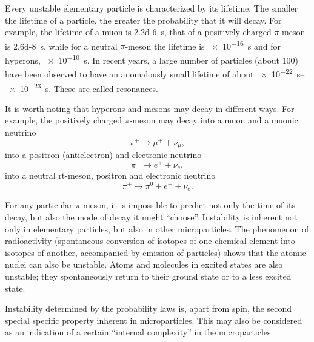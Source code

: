 \documentclass[a4paper,sfsidenotes,colorlinks=true]{tufte-book}
\numberwithin{equation}{section}
\numberwithin{figure}{section}
\begin{document}
Every unstable elementary particle is characterized by its
lifetime. The smaller the lifetime of a particle, the greater the
probability that it will decay. For example, the lifetime of a muon is
\SI{2.2d-6}{\second}, that of a positively charged $\pi$-meson is
\SI{2.6d-8}{\second}, while for a neutral $\pi$-meson the lifetime is
\SI{e-16}{\second} and for hyperons, \SI{e-10}{\second}. In recent
years, a large number of particles (about 100) have been observed to
have an anomalously small lifetime of about \SIrange{e-22}{e-23}{\second}. These
are called resonances. 

It is worth noting that hyperons and mesons may decay in different
ways. For example, the positively charged $\pi$-meson may decay into a
muon and a muonic neutrino 
\begin{equation*}
\pi^{+} \to \mu^{+} + \nu_{\mu}, 
\end{equation*}
into a positron (antielectron) and electronic neutrino
\begin{equation*}
\pi^{+} \to e^{+} + \nu_{e},
\end{equation*}
into a neutral rt-meson, positron and electronic neutrino
\begin{equation*}
\pi^{+} \to  \pi^{0} + e^{+} + \nu_{e}.
\end{equation*}



For any particular $\pi$-meson, it is impossible to predict not only
the time of its decay, but also the mode of decay it might
``choose''. Instability is inherent not only in elementary particles,
but also in other microparticles. The phenomenon of radioactivity
(spontaneous conversion of isotopes of one chemical element into
isotopes of another, accompanied by emission of particles) shows that
the atomic nuclei can also be unstable. Atoms and molecules in excited
states are also unstable; they spontaneously return to their ground
state or to a less excited state.

Instability determined by the probability laws is, apart from spin,
the second special specific property inherent in microparticles. This
may also be considered as an indication of a certain ``internal
complexity'' in the microparticles. 
\end{document}
